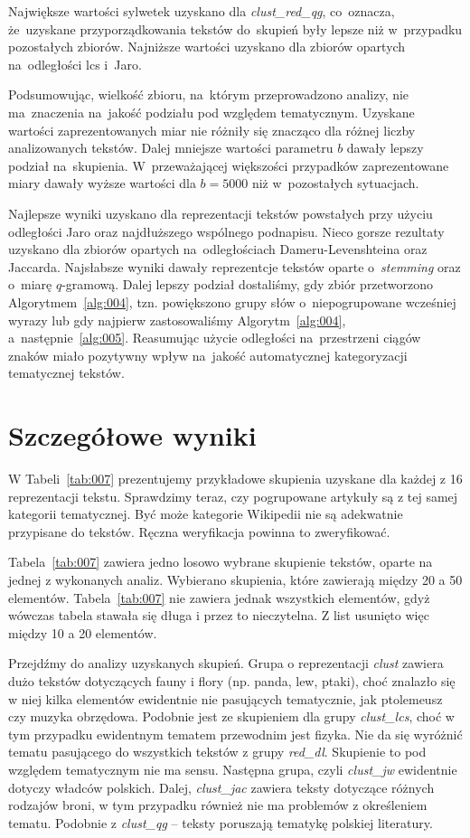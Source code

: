 \documentclass{praca1}
\begin{document}
Największe wartości sylwetek uzyskano dla \emph{clust\_red\_qg}, co~oznacza, że~uzyskane przyporządkowania tekstów do~skupień były lepsze niż w~przypadku pozostałych zbiorów. Najniższe wartości uzyskano dla zbiorów opartych na~odległości lcs i~Jaro.


Podsumowując, wielkość zbioru, na~którym przeprowadzono analizy, nie ma~znaczenia na~jakość podziału pod względem tematycznym. Uzyskane wartości zaprezentowanych miar nie różniły się znacząco dla różnej liczby analizowanych tekstów. Dalej mniejsze wartości parametru $b$ dawały lepszy podział na~skupienia. W~przeważającej większości przypadków zaprezentowane miary dawały wyższe wartości dla $b=5000$ niż w~pozostałych sytuacjach.

Najlepsze wyniki uzyskano dla reprezentacji tekstów powstałych przy użyciu odległości Jaro oraz najdłuższego wspólnego podnapisu. Nieco gorsze rezultaty uzyskano dla zbiorów opartych na~odległościach Dameru-Levenshteina oraz Jaccarda. Najsłabsze wyniki dawały reprezentcje tekstów oparte o~\emph{stemming} oraz o~miarę $q$-gramową. Dalej lepszy podział dostaliśmy, gdy zbiór przetworzono Algorytmem~\ref{alg:004}, tzn. powiększono grupy słów o~niepogrupowane wcześniej wyrazy lub gdy najpierw zastosowaliśmy Algorytm~\ref{alg:004}, a~następnie~\ref{alg:005}. Reasumując użycie odległości na~przestrzeni ciągów znaków miało pozytywny wpływ na~jakość automatycznej kategoryzacji tematycznej tekstów.

\section{Szczegółowe wyniki}

W Tabeli~\ref{tab:007} prezentujemy przykładowe skupienia uzyskane dla każdej z 16 reprezentacji tekstu. Sprawdzimy teraz, czy pogrupowane artykuły są z tej samej kategorii tematycznej. Być może kategorie Wikipedii nie są adekwatnie przypisane do tekstów. Ręczna weryfikacja powinna to zweryfikować. 

Tabela~\ref{tab:007} zawiera jedno losowo wybrane skupienie tekstów, oparte na jednej z wykonanych analiz. Wybierano skupienia, które zawierają między 20 a 50 elementów. Tabela~\ref{tab:007} nie zawiera jednak wszystkich elementów, gdyż wówczas tabela stawała się długa i przez to nieczytelna. Z list usunięto więc między 10 a 20 elementów.

Przejdźmy do analizy uzyskanych skupień. Grupa o reprezentacji \emph{clust} zawiera dużo tekstów dotyczących fauny i flory (np. panda, lew, ptaki), choć znalazło się w niej kilka elementów ewidentnie nie pasujących tematycznie, jak ptolemeusz czy muzyka obrzędowa. Podobnie jest ze skupieniem dla grupy \emph{clust\_lcs}, choć w tym przypadku ewidentnym tematem przewodnim jest fizyka. Nie da się wyróżnić tematu pasującego do wszystkich tekstów z grupy \emph{red\_dl}. Skupienie to pod względem tematycznym nie ma sensu. Następna grupa, czyli \emph{clust\_jw} ewidentnie dotyczy władców polskich. Dalej, \emph{clust\_jac} zawiera teksty dotyczące różnych rodzajów broni, w tym przypadku również nie ma problemów z określeniem tematu. Podobnie z \emph{clust\_qg} -- teksty poruszają tematykę polskiej literatury. 
\end{document}
